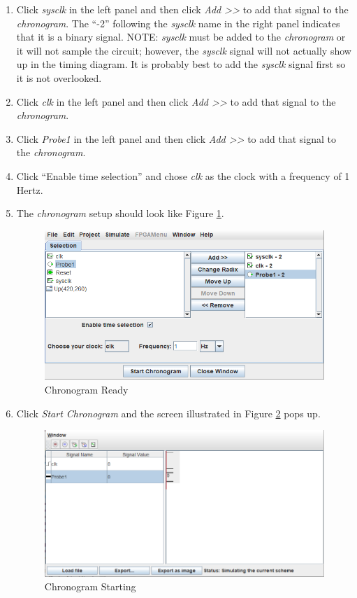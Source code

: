 \begin{enumerate}
	\item Click \textit{sysclk} in the left panel and then click \textit{Add >>} to add that signal to the \textit{chronogram}. The ``-2'' following the \textit{sysclk} name in the right panel indicates that it is a binary signal. NOTE: \textit{sysclk} must be added to the \textit{chronogram} or it will not sample the circuit; however, the \textit{sysclk} signal will not actually show up in the timing diagram. It is probably best to add the \textit{sysclk} signal first so it is not overlooked.
	\item Click \textit{clk} in the left panel and then click \textit{Add >>} to add that signal to the \textit{chronogram}.
	\item Click \textit{Probe1} in the left panel and then click \textit{Add >>} to add that signal to the \textit{chronogram}.
	\item Click ``Enable time selection'' and chose \textit{clk} as the clock with a frequency of 1 Hertz.
	\item The \textit{chronogram} setup should look like Figure \ref{fig:06-09}.
	
	\begin{figure}[H]
		\centering
		\includegraphics[width=\maxwidth{.95\linewidth}]{gfx/06-09}
		\caption{Chronogram Ready}
		\label{fig:06-09}
	\end{figure}

	\item Click \textit{Start Chronogram} and the screen illustrated in Figure \ref{fig:06-10} pops up.
	
	\begin{figure}[H]
		\centering
		\includegraphics[width=\maxwidth{.95\linewidth}]{gfx/06-10}
		\caption{Chronogram Starting}
		\label{fig:06-10}
	\end{figure}
	

\end{enumerate}
